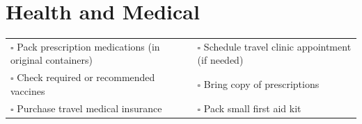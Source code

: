 
\section{Health and Medical}
\label{sec:medical}

\begin{tabular}{p{9cm} p{8cm}}
$\square$ Pack prescription medications (in original containers) & $\square$ Schedule travel clinic appointment (if needed) \\ 
$\square$ Check required or recommended vaccines & $\square$ Bring copy of prescriptions \\ 
$\square$ Purchase travel medical insurance & $\square$ Pack small first aid kit \\ 
\end{tabular}



